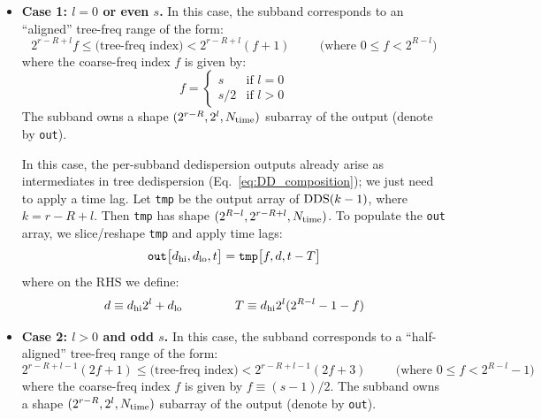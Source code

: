 \documentclass{article}
\numberwithin{equation}{section}   %
\def\DDS{{\rm DDS}}
\begin{document}
\begin{itemize}

\item {\bf Case 1: $l=0$ or even $s$.}
In this case, the subband corresponds to an ``aligned'' tree-freq range of the form:
\begin{equation}
2^{r-R+l} f \le \mbox{(tree-freq index)} < 2^{r-R+l}(f+1) \hspace{1cm} \mbox{(where $0 \le f < 2^{R-l}$)}
\end{equation}
where the coarse-freq index $f$ is given by:
\begin{equation}
f = \begin{cases} s & \mbox{if } l=0 \\ s/2 & \mbox{if } l > 0 \end{cases}
\end{equation}
The subband owns a shape $(2^{r-R}, 2^l, N_{\rm time})$ subarray of the output (denote by \verb|out|).

In this case, the per-subband dedispersion outputs already arise as intermediates in tree dedispersion
(Eq.\ \ref{eq:DD_composition}); we just need to apply a time lag.
Let \verb|tmp| be the output array of $\DDS(k-1)$, where $k=r-R+l$. 
Then \verb|tmp| has shape $(2^{R-l}, 2^{r-R+l}, N_{\rm time})$.
To populate the \verb|out| array, we slice/reshape \verb|tmp| and apply time lags:
\begin{equation}
{\tt out}\big[ d_{\rm hi}, d_{\rm lo}, t \big] = {\tt tmp}\big[ f, d, t - T \big]
\end{equation}
where on the RHS we define:
\begin{equation}
d \equiv d_{\rm hi} 2^l + d_{\rm lo}   \hspace{1.5cm} T \equiv d_{\rm hi} 2^l (2^{R-l}-1-f)
\label{eq:case1_lags}
\end{equation}

\item {\bf Case 2: $l>0$ and odd $s$.}
In this case, the subband corresponds to a ``half-aligned'' tree-freq range of the form:
\begin{equation}
2^{r-R+l-1} (2f+1) \le \mbox{(tree-freq index)} < 2^{r-R+l-1}(2f+3) \hspace{1cm} \mbox{(where $0 \le f < 2^{R-l}-1$)}
\end{equation}
where the coarse-freq index $f$ is given by $f \equiv (s-1)/2$.
The subband owns a shape $(2^{r-R}, 2^l, N_{\rm time})$ subarray of the output (denote by \verb|out|).


\end{itemize}
\end{document}
